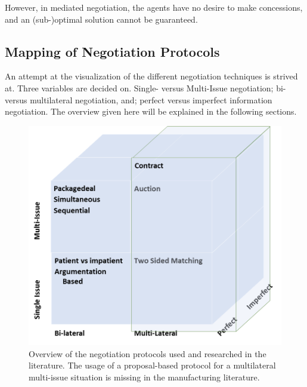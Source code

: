 However, in mediated negotiation, the agents have no desire to make concessions, and an (sub-)optimal solution cannot be guaranteed.

\subsection{Mapping of Negotiation Protocols}
An attempt at the visualization of the different negotiation techniques is strived at. Three variables are decided on. Single- versus Multi-Issue negotiation; bi- versus multilateral negotiation, and; perfect versus imperfect information negotiation. The overview given here will be explained in the following sections.
\begin{figure}[h]
	\centering
	\includegraphics[width=0.7\linewidth]{img/mapping_nego}
	\caption{Overview of the negotiation protocols used and researched in the literature. The usage of a proposal-based protocol for a multilateral multi-issue situation is missing in the manufacturing literature.}
	\label{fig:mapping_nego}
\end{figure}


